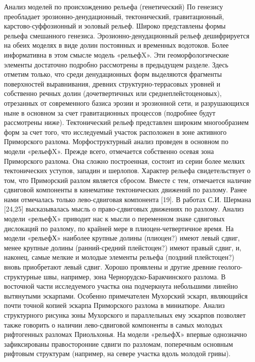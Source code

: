 \documentclass[runningheads]{AIIT}
\begin{document}
Анализ моделей по происхождению рельефа (генетический)
По генезису преобладает эрозионно-денудационный, тектонический, гравитационный, карстово-суффозионный и эоловый рельеф. Широко представлены формы рельефа смешанного генезиса.
Эрозионно-денудационный рельеф дешифрируется на обеих моделях в виде долин постоянных и временных водотоков. Более информативна в этом смысле модель «рельефX». Эти геоморфологические элементы достаточно подробно рассмотрены в предыдущем разделе. Здесь отметим только, что среди денудационных форм выделяются фрагменты поверхностей выравнивания, древних структурно-террасовых уровней и собственно речных долин (дочетвертичных или среднеплейстоценовых), отрезанных от современного базиса эрозии и эрозионной сети, и разрушающихся ныне в основном за счет гравитационных процессов (подробнее будут рассмотрены ниже).
Тектонический рельеф представлен широким многообразием форм за счет того, что исследуемый участок расположен в зоне активного Приморского разлома. Морфоструктурный анализ проведен в основном по модели «рельефX». Прежде всего, отмечается собственно осевая зона Приморского разлома. Она сложно построенная, состоит из серии более мелких тектонических уступов, западин и шерлопов. Характер рельефа свидетельствует о том, что Приморский разлом является сбросом. Вместе с тем, отмечается наличие сдвиговой компоненты в кинематике тектонических движений по разлому.
Ранее нами отмечалась только лево-сдвиговая компонента [19]. В работах С.И. Шермана [24,25] высказывалась мысль о право-сдвиговых движениях по разлому. Анализ модели «рельефX» приводит нас к мысли о переменном знаке сдвиговых дислокаций по разлому, по крайней мере в плиоцен-четвертичное время. На модели «рельефХ» наиболее крупные долины (плиоцен?) имеют левый сдвиг, менее крупные долины (ранний-средний плейстоцен?) имеют правый сдвиг, и, наконец, самые мелкие и молодые элементы рельефа (поздний плейстоцен?) вновь приобретают левый сдвиг.
Хорошо проявлены и другие древние геолого-структурные швы, например, зона Чернорудско-Баракчинского разлома. В восточной части исследуемого участка она подчеркнута небольшими линейно вытянутыми эскарпами. Особенно примечателен Мухорский эскарп, являющийся почти точной копией эскарпа Приморского разлома в миниатюре. Анализ структурного рисунка зоны Мухорского и параллельных ему эскарпов позволяет также говорить о наличии лево-сдвиговой компоненты в самых молодых рифтогенных разломах Приольхонья. На модели «рельефХ» впервые однозначно зафиксированы правосторонние сдвиги по разломам, поперечным основным рифтовым структурам (например, на севере участка вдоль молодой гривы).
\end{document}
